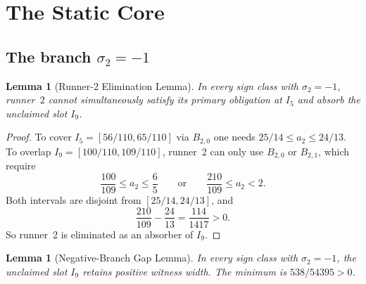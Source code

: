 \documentclass[12pt,a4paper]{amsart}
\newtheorem{lemma}[theorem]{Lemma}
\theoremstyle{definition}
\theoremstyle{remark}
\begin{document}
\section{The Static Core}

\subsection{The branch \texorpdfstring{$\sigma_2=-1$}{sigma2 = -1}}

\begin{lemma}[Runner-2 Elimination Lemma]
In every sign class with $\sigma_2=-1$, runner~$2$ cannot simultaneously satisfy its
primary obligation at $I_5$ and absorb the unclaimed slot $I_9$.
\end{lemma}

\begin{proof}
To cover $I_5=[56/110,65/110]$ via $B_{2,0}$ one needs $25/14\le a_2\le 24/13$.
To overlap $I_9=[100/110,109/110]$, runner~2 can only use $B_{2,0}$ or $B_{2,1}$,
which require
\[
  \frac{100}{109}\le a_2\le \frac{6}{5}\qquad\text{or}\qquad
  \frac{210}{109}\le a_2<2.
\]
Both intervals are disjoint from $[25/14,24/13]$, and
\[
  \frac{210}{109}-\frac{24}{13}=\frac{114}{1417}>0.
\]
So runner~2 is eliminated as an absorber of $I_9$.
\end{proof}

\begin{lemma}[Negative-Branch Gap Lemma]
In every sign class with $\sigma_2=-1$, the unclaimed slot $I_9$ retains positive witness
width. The minimum is $538/54395>0$.
\end{lemma}
\end{document}
